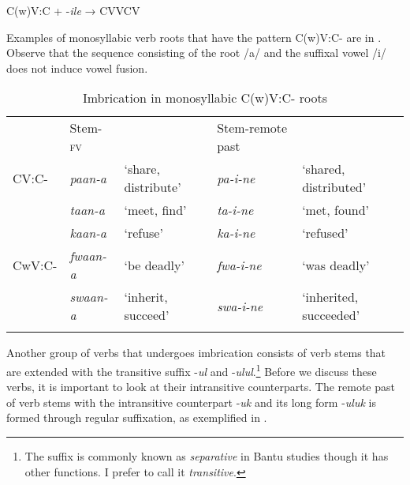 \documentclass[output=paper]{langsci/langscibook}
\begin{document}
\ea
\label{ex:6.kawasha}
C(w)V:C + -\textit{ile}  → CVVCV
\z

Examples of monosyllabic verb roots that have the pattern C(w)V:C- are in . Observe that the sequence consisting of the root /a/ and the suffixal vowel /i/ does not induce vowel fusion. 

\begin{table}
\begin{tabular}{lllll}
\lsptoprule
 & Stem-\textsc{fv} &  & Stem-remote past & \\
CV:C- & \textit{paan-a} & `share, distribute' & \textit{pa-i-ne} & `shared, distributed' \\
 & \textit{taan-a} & `meet, find' & \textit{ta-i-ne} & `met, found' \\
 & \textit{kaan-a} & `refuse' & \textit{ka-i-ne} & `refused' \\
CwV:C- & \textit{fwaan-a} & `be deadly' & \textit{fwa-i-ne} & `was deadly' \\
 & \textit{swaan-a} & `inherit, succeed' & \textit{swa-i-ne} & `inherited, succeeded' \\

\lspbottomrule
\end{tabular}

\caption{Imbrication in monosyllabic C(w)V:C- roots}
\label{tab:21.kawasha}

\end{table}


Another group of verbs that undergoes imbrication consists of verb stems that are extended with the transitive suffix -\textit{ul }and -\textit{ulul}.\footnote{The suffix is commonly known as \textit{separative} in Bantu studies though it has other functions. I prefer to call it \textit{transitive}.} Before we discuss these verbs, it is important to look at their intransitive counterparts. The remote past of verb stems with the intransitive counterpart -\textit{uk} and its long form -\textit{uluk} is formed through regular suffixation, as exemplified in .
\end{document}
